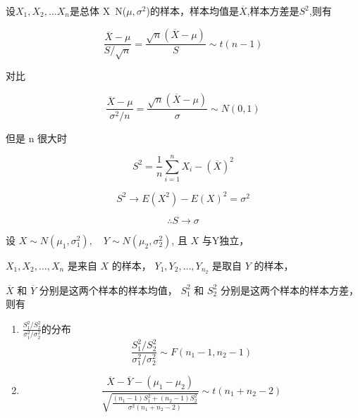 \begin{theorem}[样本均值和样本方差的关系]
    设$X_1,X_2,...X_n$是总体 X~N($\mu,\sigma^2$)的样本，样本均值是$\overline{X}$,样本方差是$S^2$,则有

    \begin{equation}
        {\frac{\overline{X}-\mu}{S / \sqrt{n}} = \frac{\sqrt{n}(\overline{X} - \mu)}{{ S}} \sim t(n-1)}
    \end{equation}

    对比

    \begin{equation}
        \frac{\overline{X}-\mu}{\sigma^2/n} = \frac{\sqrt{n}(\overline{X}-\mu)}{{ \sigma}} \sim N(0,1)
    \end{equation}

    但是 n 很大时

    \begin{equation}
        S^2 = \frac{1}{n} \sum_{i=1}^n X_i - (\overline{X})^2
    \end{equation}

    \begin{equation}
        S^2 \to E(X^2) - E(X)^2= \sigma^2
    \end{equation}

    \begin{equation}
        \therefore S \to \sigma
    \end{equation}
\end{theorem}

\begin{theorem}
    设 $ X \sim N\left(\mu_{1}, \sigma_{1}^{2}\right), \quad Y \sim N\left(\mu_{2}, \sigma_{2}^{2}\right) $, 且 $ X $ 与Y独立，

    $ X_{1}, X_{2}, \ldots, X_{n} $ 是来自 $ X $ 的样本， $ Y_{1}, Y_{2}, \ldots, Y_{n_{2}} $ 是取自 $ Y $ 的样本，

    $ \overline{{X}} $ 和 $ \overline{{Y}} $ 分别是这两个样本的样本均值， $ {S}_{1}^{2} $ 和 $ {S}_{2}^{2} $ 分别是这两个样本的样本方差，则有

    \begin{enumerate}
        \item $\frac{S_1^2/S^2_2}{\sigma_1^2 / \sigma_2^2}$的分布
              \begin{equation}
                  {
                          \frac{S_1^2/S^2_2}{\sigma_1^2 / \sigma_2^2} \sim F(n_1 - 1, n_2 -1)}
              \end{equation}
        \item \begin{equation}
                  \frac{\overline{X} - \overline{Y}- (\mu_1 - \mu_2 )}{\sqrt{ \frac{(n_1 - 1) S_1^2 + (n_2 - 1 ) S_2^2 }{\sigma^2 (n_1+n_2-2)} }} \sim t(n_1+n_2-2)
              \end{equation}
    \end{enumerate}

\end{theorem}

